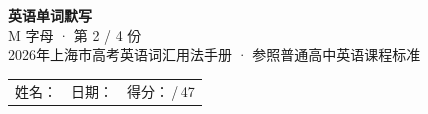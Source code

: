 \documentclass[10pt,a4paper]{article}
\begin{document}
\pagestyle{plain}

\begin{center}
{\LARGE\bfseries 英语单词默写}\\[0.22em]
{\large M 字母 · 第 2 / 4 份}\\[0.18em]
{\small 2026年上海市高考英语词汇用法手册 · 参照普通高中英语课程标准}
\end{center}

\vspace{0.25em}
\noindent\begin{tabular}{@{}p{}@{}p{}@{}p{}@{}}
姓名：\underline{\hspace{2.0cm}} & 日期：\underline{\hspace{2.0cm}} & 得分：\underline{\hspace{1.3cm}}\,/\,47 \\
\end{tabular}

\vspace{0.3em}

\vspace{0.08em}
\end{document}
